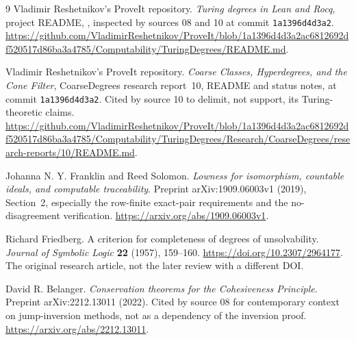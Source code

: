 \documentclass[11pt,letterpaper]{article}
\theoremstyle{plain}
\theoremstyle{definition}
\theoremstyle{remark}
\numberwithin{equation}{section}
\newcommand{\shortrepo}{\texttt{1a1396d4d3a2}}
\begin{document}
\begin{thebibliography}{9}
Vladimir Reshetnikov's ProveIt repository.
\emph{Turing degrees in Lean and Rocq}, project README,
, inspected by sources 08 and 10 at commit
\shortrepo.
\url{https://github.com/VladimirReshetnikov/ProveIt/blob/1a1396d4d3a2ac6812692df520517d86ba3a4785/Computability/TuringDegrees/README.md}.

Vladimir Reshetnikov's ProveIt repository.
\emph{Coarse Classes, Hyperdegrees, and the Cone Filter}, CoarseDegrees research
report~10, README and status notes, at commit \shortrepo. Cited by source 10 to
delimit, not support, its Turing-theoretic claims.
\url{https://github.com/VladimirReshetnikov/ProveIt/blob/1a1396d4d3a2ac6812692df520517d86ba3a4785/Computability/TuringDegrees/Research/CoarseDegrees/research-reports/10/README.md}.

Johanna N. Y. Franklin and Reed Solomon.
\emph{Lowness for isomorphism, countable ideals, and computable traceability}.
Preprint arXiv:1909.06003v1 (2019), Section~2, especially the row-finite exact-pair
requirements and the no-disagreement verification.
\url{https://arxiv.org/abs/1909.06003v1}.

Richard Friedberg.
A criterion for completeness of degrees of unsolvability.
\emph{Journal of Symbolic Logic} \textbf{22} (1957), 159--160.
\url{https://doi.org/10.2307/2964177}.
The original research article, not the later review with a different DOI.

David R. Belanger.
\emph{Conservation theorems for the Cohesiveness Principle}.
Preprint arXiv:2212.13011 (2022).
Cited by source 08 for contemporary context on jump-inversion methods, not as a
dependency of the inversion proof.
\url{https://arxiv.org/abs/2212.13011}.
\end{thebibliography}
\endgroup
\end{document}
